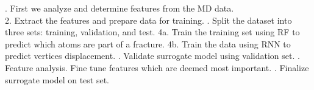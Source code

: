 \begin{itemize}
\begin{itemize}
. First we analyze and determine features from the MD data.
    \\
    2. Extract the features and prepare data for training. 
    . Split the dataset into three sets: training, validation, and test.
    \newline
    4a. Train the training set using RF to predict which atoms are part of a fracture.
    \newline
    4b. Train the data using RNN to predict vertices displacement.
    . Validate surrogate model using validation set. 
    . Feature analysis. Fine tune features which are deemed most important. 
    . Finalize surrogate model on test set. 




\end{itemize}


\end{itemize}